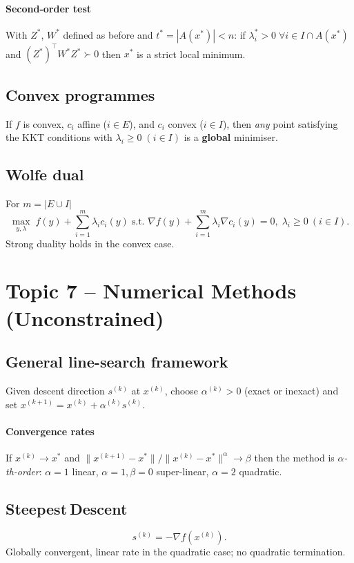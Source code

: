 \documentclass[12pt]{article}
\begin{document}
\paragraph{Second-order test}
With \(Z^\ast\), \(W^\ast\) defined as before and
\(t^\ast=|A(x^\ast)|<n\):
if \(\lambda_i^\ast>0\;\forall i\in I\cap A(x^\ast)\) and
\((Z^\ast)^\top W^\ast Z^\ast\succ0\) then \(x^\ast\) is a strict local
minimum.

\subsection{Convex programmes}
If \(f\) is convex, \(c_i\) affine (\(i\in E\)), and \(c_i\) convex
(\(i\in I\)), then {\em any} point satisfying the KKT conditions with
\(\lambda_i\ge0\;(i\in I)\) is a {\bf global} minimiser.

\subsection{Wolfe dual}
For \(m=|E\cup I|\)
\[
\max_{y,\lambda}\;
f(y)+\sum_{i=1}^m\lambda_i c_i(y)\;
\text{s.t. } \nabla f(y)+\sum_{i=1}^m\lambda_i\nabla c_i(y)=0,\;
\lambda_i\ge0\ (i\in I).
\]
Strong duality holds in the convex case.

\section{Topic 7 – Numerical Methods (Unconstrained)}

\subsection{General line-search framework}
Given descent direction \(s^{(k)}\) at \(x^{(k)}\), choose
\(\alpha^{(k)}>0\) (exact or inexact) and set
\(x^{(k+1)}=x^{(k)}+\alpha^{(k)}s^{(k)}\).

\paragraph{Convergence rates}
If \(x^{(k)}\to x^\ast\) and
\(\|x^{(k+1)}-x^\ast\|/\|x^{(k)}-x^\ast\|^{\alpha}\to\beta\)
then the method is {\em \(\alpha\)-th-order}:
\(\alpha=1\) linear, \(\alpha=1,\beta=0\) super-linear,
\(\alpha=2\) quadratic.

\subsection{Steepest Descent}
\[
s^{(k)}=-\nabla f(x^{(k)}).
\]
Globally convergent, linear rate in the quadratic case; no quadratic
termination.
\end{document}
